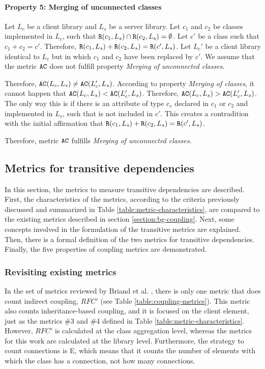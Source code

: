 \paragraph{Property 5: Merging of unconnected classes}
Let $L_c$ be a client library and $L_s$ be a server library. Let $c_1$ and $c_2$ be classes implemented in $L_c$, such that $\verb|R|(c_1, L_s) \cap \verb|R|(c_2, L_s) = \emptyset$. Let $c'$ be a class such that $c_1 + c_2 = c'$. Therefore, $\verb|R|(c_1, L_s) + \verb|R|(c_2, L_s) = \verb|R|(c', L_s)$. Let $L_c'$ be a client library identical to $L_c$ but in which $c_1$ and $c_2$ have been replaced by $c'$. We assume that the metric $\verb|AC|$ does not fulfill property \textit{Merging of unconnected classes}.

Therefore, $\verb|AC|(L_c, L_s) \neq \verb|AC|(L_c', L_s)$. According to property \textit{Merging of classes}, it cannot happen that $\verb|AC|(L_c, L_s) < \verb|AC|(L_c', L_s)$. Therefore, $\verb|AC|(L_c, L_s) > \verb|AC|(L_c', L_s)$. The only way this is if there is an attribute of type $c_s$ declared in $c_1$ or $c_2$ and implemented in $L_s$, such that is not included in $c'$. This creates a contradition with the initial affirmation that $\verb|R|(c_1, L_s) + \verb|R|(c_2, L_s) = \verb|R|(c', L_s)$.

Therefore, metric $\verb|AC|$ fulfills \textit{Merging of unconnected classes}.

\subsection{Metrics for transitive dependencies}\label{subsect:defMetricsTransitive}
In this section, the metrics to measure transitive dependencies are described. First, the characteristics of the metrics, according to the criteria previously discussed and summarized in Table \ref{table:metric-characteristics}, are compared to the existing metrics described in section \ref{section:bg-coupling}. Next, some concepts involved in the formulation of the transitive metrics are explained. Then, there is a formal definition of the two metrics for transitive dependencies. Finally, the five properties of coupling metrics are demonstrated.

\subsubsection{Revisiting existing metrics}
In the set of metrics reviewed by Briand et al. \cite{briand1999unified}, there is only one metric that does count indirect coupling, $RFC'$ (see Table \ref{table:coupling-metrics}). This metric also counts inheritance-based coupling, and it is focused on the client element, just as the metrics \#3 and \#4 defined in Table \ref{table:metric-characteristics}. However, $RFC'$ is calculated at the class aggregation level, whereas the metrics for this work are calculated at the library level. Furthermore, the strategy to count connections is E, which means that it counts the number of elements with which the class has a connection, not how many connections.

